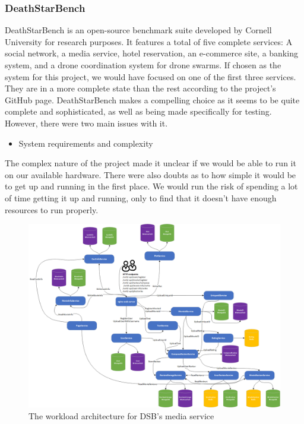 \subsubsection{DeathStarBench}
DeathStarBench is an open-source benchmark suite developed by Cornell University for research purposes. 
It features a total of five complete services: A social network, a media service, hotel reservation, an e-commerce site, a banking system, and a drone coordination system for drone swarms. If chosen as the system for this project, we would have focused on one of the first three services. They are in a more complete state than the rest according to the project's GitHub page. 
DeathStarBench makes a compelling choice as it seems to be quite complete and sophisticated, as well as being made specifically for testing. \cite*{Gan2019} \\
However, there were two main issues with it.
\begin{itemize}
    \item System requirements and complexity
\end{itemize}
The complex nature of the project made it unclear if we would be able to run it on our available hardware. There were also doubts as to how simple it would be to get up and running in the first place. We would run the risk of spending a lot of time getting it up and running, only to find that it doesn't have enough resources to run properly.
\begin{figure}[ht]
\centering 
\includegraphics[width=\columnwidth]{Figures/Charts/media_microservices_architecture.png}
\caption{The workload architecture for DSB's media service}
\label{DSB-media}
\end{figure}

